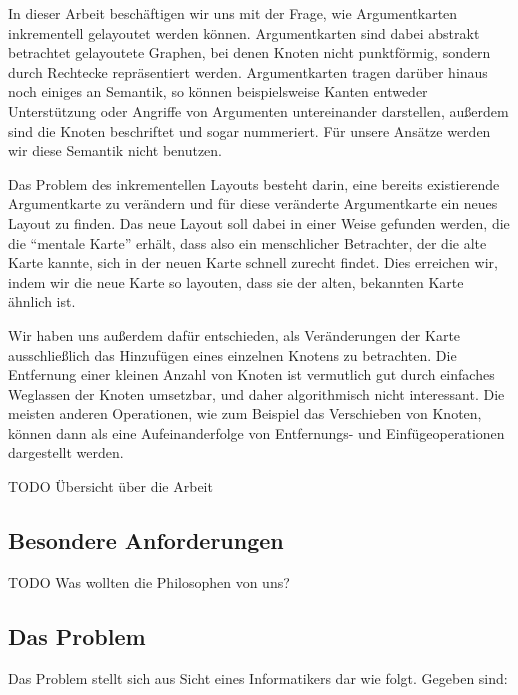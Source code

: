 \label{sub:intro}

In dieser Arbeit beschäftigen wir uns mit der Frage, wie Argumentkarten inkrementell gelayoutet werden können. Argumentkarten sind dabei abstrakt betrachtet gelayoutete Graphen, bei denen Knoten nicht punktförmig, sondern durch Rechtecke repräsentiert werden. Argumentkarten tragen darüber hinaus noch einiges an Semantik, so können beispielsweise Kanten entweder Unterstützung oder Angriffe von Argumenten untereinander darstellen, außerdem sind die Knoten beschriftet und sogar nummeriert. Für unsere Ansätze werden wir diese Semantik nicht benutzen.

Das Problem des inkrementellen Layouts besteht darin, eine bereits existierende Argumentkarte zu verändern und für diese veränderte Argumentkarte ein neues Layout zu finden. Das neue Layout soll dabei in einer Weise gefunden werden, die die "`mentale Karte"' erhält, dass also ein menschlicher Betrachter, der die alte Karte kannte, sich in der neuen Karte schnell zurecht findet. Dies erreichen wir, indem wir die neue Karte so layouten, dass sie der alten, bekannten Karte ähnlich ist.

Wir haben uns außerdem dafür entschieden, als Veränderungen der Karte ausschließlich das Hinzufügen eines einzelnen Knotens zu betrachten. Die Entfernung einer kleinen Anzahl von Knoten ist vermutlich gut durch einfaches Weglassen der Knoten umsetzbar, und daher algorithmisch nicht interessant. Die meisten anderen Operationen, wie zum Beispiel das Verschieben von Knoten, können dann als eine Aufeinanderfolge von Entfernungs- und Einfügeoperationen dargestellt werden.

TODO Übersicht über die Arbeit

\subsection{Besondere Anforderungen}
\label{sub:tasks}

TODO Was wollten die Philosophen von uns?

\subsection{Das Problem}
\label{sub:problem}

Das Problem stellt sich aus Sicht eines Informatikers dar wie folgt. Gegeben sind:


